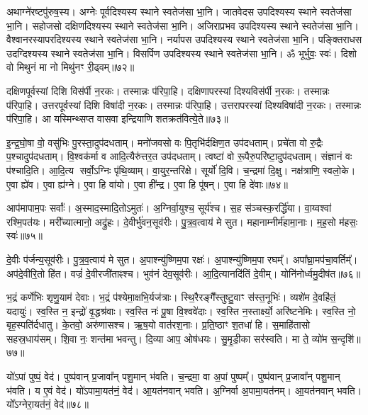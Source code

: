 अथाग्ने॑रष्टपु॑रुष॒स्य। 
अग्नेः पूर्वदिश्यस्य स्थाने स्वतेज॑सा भा॒नि। 
जातवेदस उपदिश्यस्य स्थाने स्वतेज॑सा भा॒नि। 
सहोजसो दक्षिणदिश्यस्य स्थाने स्वतेज॑सा भा॒नि। 
अजिराप्रभव उपदिश्यस्य स्थाने स्वतेज॑सा भा॒नि। 
वैश्वानरस्यापरदिश्यस्य स्थाने स्वतेज॑सा भा॒नि। 
नर्यापस उपदिश्यस्य स्थाने स्वतेज॑सा भा॒नि। 
पङ्क्तिराधस उदग्दिश्यस्य स्थाने स्वतेज॑सा भा॒नि। 
विसर्पिण उपदिश्यस्य स्थाने स्वतेज॑सा भा॒नि। 
ॐ भूर्भुवः॒ स्वः॑। दिशो वो मिथुनं मा नो मिथु॑नꣳ री॒ढ्वम्॥७२॥\anuvakamend


दक्षिणपूर्वस्यां दिशि विस॑र्पी न॒रकः। तस्मान्नः प॑रिपा॒हि। 
दक्षिणापरस्यां दिश्यविस॑र्पी न॒रकः। तस्मान्नः प॑रिपा॒हि। 
उत्तरपूर्वस्यां दिशि विषा॑दी न॒रकः। तस्मान्नः प॑रिपा॒हि। 
उत्तरापरस्यां दिश्यविषा॑दी न॒रकः। तस्मान्नः प॑रिपा॒हि। 
आ यस्मिन्थ्सप्त वासवा इन्द्रियाणि शतक्रत॑वित्ये॒ते॥७३॥\anuvakamend


इ॒न्द्र॒घो॒षा वो॒ वसु॑भिः पु॒रस्ता॒दुप॑दधताम्। 
मनो॑जवसो वः पि॒तृभि॑र्दक्षिण॒त उप॑दधताम्। 
प्रचे॑ता वो रु॒द्रैः प॒श्चादुप॑दधताम्। 
वि॒श्वक॑र्मा व आदि॒त्यैरु॑त्तर॒त उप॑दधताम्। 
त्वष्टा॑ वो रू॒पैरु॒परि॑ष्टा॒दुप॑\-दधताम्। 
संज्ञानं वः प॑श्चादि॒ति। आ॒दि॒त्य सर्वो॒ऽग्निः पृ॑थि॒व्याम्। 
वा॒युर॒न्तरि॑क्षे। सूर्यो॑ दि॒वि। च॒न्द्रमा॑ दि॒क्षु। 
नक्ष॑त्राणि॒ स्वलो॒के। ए॒वा ह्ये॑व। ए॒वा ह्य॑ग्ने। 
ए॒वा हि वा॑यो। ए॒वा ही᳚न्द्र। ए॒वा हि पू॑षन्। ए॒वा हि दे॑वाः॥७४॥\anuvakamend


आप॑मापाम॒पः सर्वाः᳚। अ॒स्माद॒स्मादि॒तोऽमुतः॑।
अ॒ग्निर्वा॒युश्च॒ सूर्य॑श्च। स॒ह स॑ञ्चस्क॒रर्द्धि॑या। 
वा॒य्वश्वा॑ रश्मि॒पत॑यः। मरी᳚च्यात्मानो॒ अद्रु॑हः। 
दे॒वीर्भु॑वन॒सूव॑रीः। पु॒त्र॒व॒त्वाय॑ मे सुत। 
महानाम्नीर्म॑हामा॒नाः। म॒ह॒सो म॑हसः॒ स्वः॑॥७५॥


दे॒वीः प॑र्जन्य॒सूव॑रीः। पु॒त्र॒व॒त्वाय॑ मे सुत। 
अ॒पाश्न्यु॑ष्णिम॒पा रक्षः॑। अ॒पाश्न्यु॑ष्णि\-म॒पा रघम्᳚। 
अपा᳚घ्रा॒मप॑चा॒वर्तिम्᳚। अप॑दे॒वीरि॒तो हि॑त। 
वज्रं॑ दे॒वीरजी॑ताꣴश्च। भुव॑नं देव॒सूव॑रीः। 
आ॒दि॒त्यानदि॑तिं दे॒वीम्। योनि॑नोर्ध्वमु॒दीष॑त॥७६॥


भ॒द्रं कर्णे॑भिः शृणु॒याम॑ देवाः। भ॒द्रं प॑श्येमा॒क्षभि॒र्यज॑त्राः। 
स्थि॒रैरङ्गै᳚स्तुष्टु॒वाꣳ स॑स्त॒नूभिः॑। व्यशे॑म दे॒वहि॑तं॒ यदायुः॑। 
स्व॒स्ति न॒ इन्द्रो॑ वृ॒द्धश्र॑वाः। स्व॒स्ति नः॑ पू॒षा वि॒श्ववे॑दाः। 
स्व॒स्ति न॒स्तार्क्ष्यो॒ अरि॑ष्टनेमिः। स्व॒स्ति नो॒ बृह॒स्पति॑र्दधातु। 
के॒तवो॒ अरु॑णासश्च। ऋ॒ष॒यो वात॑रश॒नाः। 
प्र॒ति॒ष्ठाꣳ श॒तधा॑ हि। स॒माहि॑तासो सहस्र॒धाय॑सम्। 
शि॒वा नः॒ शन्त॑मा भवन्तु। दि॒व्या आप॒ ओष॑धयः। 
सु॒मृ॒डी॒का सर॑स्वति। मा ते॒ व्यो॑म स॒न्दृशि॑॥७७॥\anuvakamend


यो॑ऽपां पुष्पं॒ वेद॑। पुष्प॑वान्‌ प्र॒जावा᳚न् पशु॒मान् भ॑वति। 
च॒न्द्रमा॒ वा अ॒पां पुष्पम्᳚। पुष्प॑वान् प्र॒जावा᳚न् पशु॒मान्‌ भ॑वति। 
य ए॒वं वेद॑। यो॑ऽपामा॒यत॑नं॒ वेद॑। 
आ॒यत॑नवान्‌ भवति। अ॒ग्निर्वा अ॒पामा॒यत॑नम्। 
आ॒यत॑नवान्‌ भवति। यो᳚ऽग्नेरा॒यत॑नं॒ वेद॑॥७८॥


